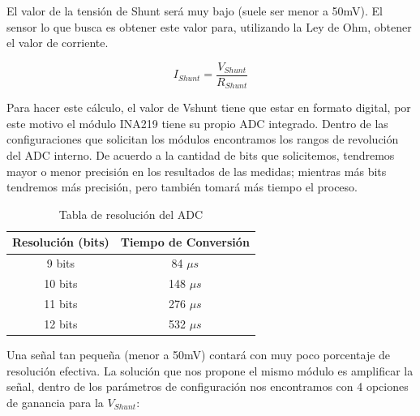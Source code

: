                     El valor de la tensión de Shunt será muy bajo (suele ser menor a 50mV). El sensor lo que busca es obtener este valor para, utilizando la Ley de Ohm, obtener el valor de corriente.\par

                    \begin{equation}
                        I_{Shunt} = \frac{V_{Shunt}}{R_{Shunt}}
                    \end{equation}

                    Para hacer este cálculo, el valor de Vshunt tiene que estar en formato digital, por este motivo el módulo INA219 tiene su propio ADC integrado. Dentro de las configuraciones que solicitan los módulos encontramos los rangos de revolución del ADC interno. De acuerdo a la cantidad de bits que solicitemos, tendremos mayor o menor precisión en los resultados de las medidas; mientras más bits tendremos más precisión, pero también tomará más tiempo el proceso.\par

                    \begin{table}[H]
                        \centering
                        \begin{tabular}{|c|c|}
                        \hline
                            Resolución (bits) & Tiempo de Conversión\\
                        \hline
                             9 bits & 84 $\mu s$ \\
                        \hline
                            10 bits & 148 $\mu s$\\
                        \hline
                            11 bits & 276 $\mu s$\\
                        \hline
                            12 bits & 532 $\mu s$\\
                        \hline
                        \end{tabular}
                        \caption{Tabla de resolución del ADC}
                        \label{tab:s2}
                    \end{table}

                    Una señal tan pequeña (menor a 50mV) contará con muy poco porcentaje de resolución efectiva. La solución que nos propone el mismo módulo es amplificar la señal, dentro de los parámetros de configuración nos encontramos con 4 opciones de ganancia para la $V_{Shunt}$:\par

